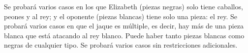 \documentclass{oci}
\begin{document}
\begin{scoreDescription}
  Se probará varios casos en los que Elizabeth (piezas negras) solo tiene caballos, peones
  y al rey; y el oponente (piezas blancas) tiene solo una pieza: el rey.
  Se probará varios casos en que el jaque es múltiple, es decir, hay más de una pieza
  blanca que está atacando al rey blanco.
  Puede haber tanto piezas blancas como negras de cualquier tipo.
  Se probará varios casos sin restricciones adicionales.
\end{scoreDescription}

\begin{sampleDescription}
\end{sampleDescription}
\end{document}

